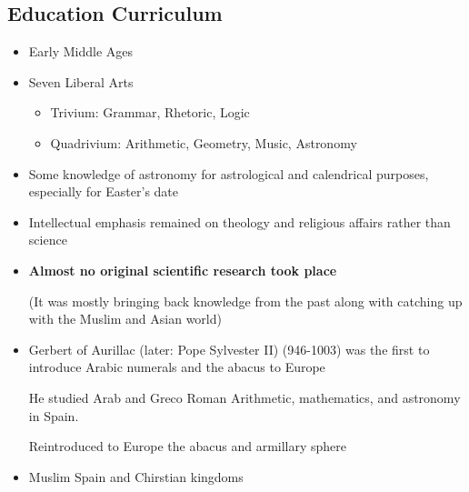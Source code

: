 \documentclass{article}
\begin{document}
\subsection{Education Curriculum}
\begin{itemize}
  \item Early Middle Ages
  \item Seven Liberal Arts
    \begin{itemize}
      \item Trivium: Grammar, Rhetoric, Logic
      \item Quadrivium: Arithmetic, Geometry, Music, Astronomy
    \end{itemize}
  \item Some knowledge of astronomy for astrological and calendrical purposes,
    especially for Easter's date
  \item Intellectual emphasis remained on theology and religious affairs rather than science
  \item \textbf{Almost no original scientific research took place}

    (It was mostly bringing back knowledge from the past along
    with catching up with the Muslim and Asian world)
  \item Gerbert of Aurillac (later: Pope Sylvester II) (946-1003)
    was the first to introduce Arabic numerals and the abacus to Europe

    He studied Arab and Greco Roman Arithmetic, mathematics, and astronomy in Spain.

    Reintroduced to Europe the abacus and armillary sphere
  \item Muslim Spain and Chirstian kingdoms
\end{itemize}
\end{document}
